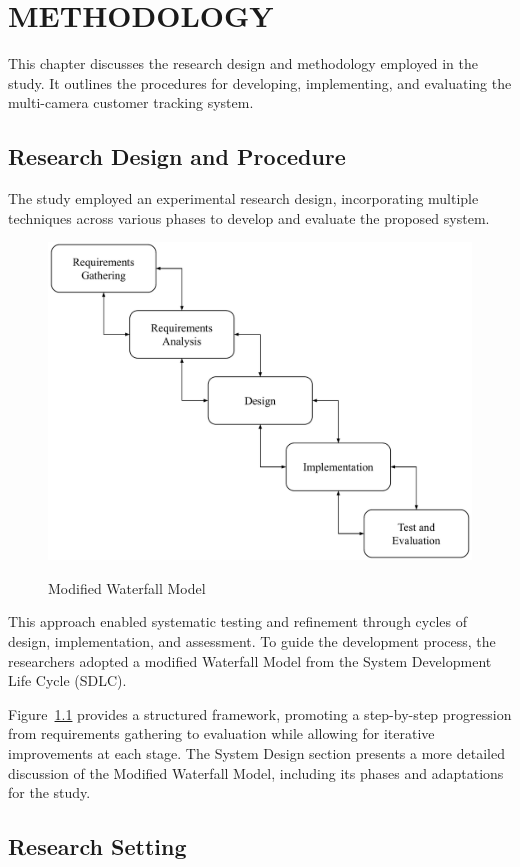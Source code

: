 
\chapter{METHODOLOGY}
{\baselineskip
This chapter discusses the research design and methodology employed in the study. It outlines the procedures for developing, implementing, and evaluating the multi-camera customer tracking system.

\section{Research Design and Procedure}
The study employed an experimental research design, incorporating multiple techniques across various phases to develop and evaluate the proposed system.

\begin{figure}[H]
	\caption[Modified Waterfall Model]{\newline \newline Modified Waterfall Model}
	\centering
	\includegraphics[width=0.7\linewidth]{fig/3.1.pdf}
	\label{fig:3.1}
\end{figure}
This approach enabled systematic testing and refinement through cycles of design, implementation, and assessment. To guide the development process, the researchers adopted a modified Waterfall Model from the System Development Life Cycle (SDLC).

Figure~\ref{fig:3.1} provides a structured framework, promoting a step-by-step progression from requirements gathering to evaluation while allowing for iterative improvements at each stage. The System Design section presents a more detailed discussion of the Modified Waterfall Model, including its phases and adaptations for the study.

\section{Research Setting}

}
